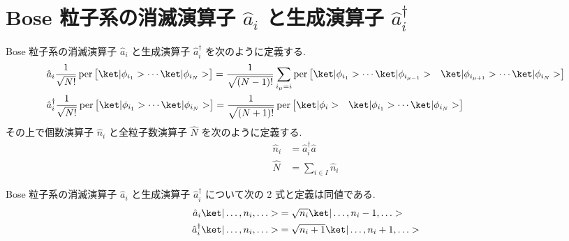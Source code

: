 \documentclass[uplatex,dvipdfmx,a4paper,11pt]{jlreq}
\DeclareMathOperator{\per}{per}
\numberwithin{equation}{section}
\theoremstyle{definition}
\begin{document}
\section{Bose 粒子系の消滅演算子 $\hat{a}_i$ と生成演算子 $\hat{a}_i^\dagger$}
\begin{definition}
  Bose 粒子系の消滅演算子 $\hat{a}_i$ と生成演算子 $\hat{a}_i^\dagger$ を次のように定義する.
  \begin{align}
     & \hat{a}_i\frac{1}{\sqrt{N!}}\per\begin{bmatrix}\ket|\phi_{i_1}> \cdots \ket|\phi_{i_N}>\end{bmatrix} = \frac{1}{\sqrt{(N-1)!}}\sum_{i_\mu = i}\per\begin{bmatrix}\ket|\phi_{i_1}> \cdots \ket|\phi_{i_{\mu - 1}}> & \ket|\phi_{i_{\mu + 1}}> \cdots \ket|\phi_{i_N}>\end{bmatrix} \\
     & \hat{a}_i^\dagger\frac{1}{\sqrt{N!}}\per\begin{bmatrix}\ket|\phi_{i_1}> \cdots \ket|\phi_{i_N}>\end{bmatrix} = \frac{1}{\sqrt{(N+1)!}}\per\begin{bmatrix}\ket|\phi_{i}> & \ket|\phi_{i_1}> \cdots \ket|\phi_{i_N}>\end{bmatrix}
  \end{align}
  その上で個数演算子 $\hat{n}_i$ と全粒子数演算子 $\hat{N}$ を次のように定義する.
  \begin{align}
    \hat{n}_i & = \hat{a}_i^\dagger\hat{a} \\
    \hat{N}   & = \sum_{i\in I}\hat{n}_i
  \end{align}
\end{definition}
\begin{theorem}[Q21-35, Q21-36]
  Bose 粒子系の消滅演算子 $\hat{a}_i$ と生成演算子 $\hat{a}_i^\dagger$ について次の 2 式と定義は同値である.
  \begin{align}
    \hat{a}_i\ket|\ldots,n_i,\ldots>         & = \sqrt{n_i}\ket|\ldots,n_i-1,\ldots>   \\
    \hat{a}_i^\dagger\ket|\ldots,n_i,\ldots> & = \sqrt{n_i+1}\ket|\ldots,n_i+1,\ldots>
  \end{align}
  \label{Bose feature}
\end{theorem}
\end{document}
